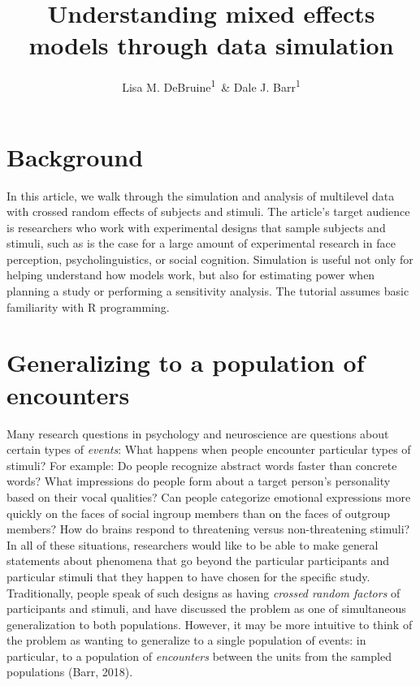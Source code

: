 \documentclass[doc,floatsintext]{apa6}
\title{Understanding mixed effects models through data simulation}
\author{Lisa M. DeBruine\textsuperscript{1}~\& Dale J. Barr\textsuperscript{1}}
\date{}
\affiliation{
\vspace{0.5cm}
\textsuperscript{1} Institute of Neuroscience and Psychology, University of Glasgow}
\begin{document}
\maketitle

\section{Background}\label{background}

In this article, we walk through the simulation and analysis of
multilevel data with crossed random effects of subjects and stimuli. The
article's target audience is researchers who work with experimental
designs that sample subjects and stimuli, such as is the case for a
large amount of experimental research in face perception,
psycholinguistics, or social cognition. Simulation is useful not only
for helping understand how models work, but also for estimating power
when planning a study or performing a sensitivity analysis. The tutorial
assumes basic familiarity with R programming.

\section{Generalizing to a population of
encounters}\label{generalizing-to-a-population-of-encounters}

Many research questions in psychology and neuroscience are questions
about certain types of \emph{events}: What happens when people encounter
particular types of stimuli? For example: Do people recognize abstract
words faster than concrete words? What impressions do people form about
a target person's personality based on their vocal qualities? Can people
categorize emotional expressions more quickly on the faces of social
ingroup members than on the faces of outgroup members? How do brains
respond to threatening versus non-threatening stimuli? In all of these
situations, researchers would like to be able to make general statements
about phenomena that go beyond the particular participants and
particular stimuli that they happen to have chosen for the specific
study. Traditionally, people speak of such designs as having
\emph{crossed random factors} of participants and stimuli, and have
discussed the problem as one of simultaneous generalization to both
populations. However, it may be more intuitive to think of the problem
as wanting to generalize to a single population of events: in
particular, to a population of \emph{encounters} between the units from
the sampled populations (Barr, 2018).
\end{document}
